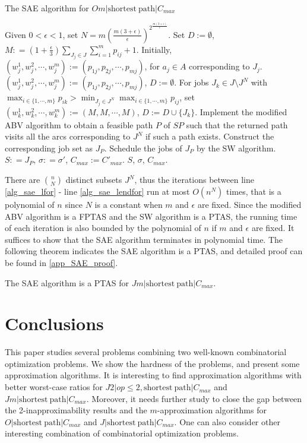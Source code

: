 \documentclass{llncs}
\numberwithin{subcase}{case}
\begin{document}
\begin{algorithm}[htb]
\caption{The SAE algorithm for $Om|\mathrm{shortest}~\mathrm{path}|C_{max}$}
\label{alg_sae}
\begin{algorithmic}[1]
\STATE Given $0< \epsilon <1$, set $N = m\left(\frac{m(3+\epsilon)}{\epsilon}\right)^{2^{\frac{m(3+\epsilon)}{\epsilon}}}$.
\STATE Set $D:=\emptyset$, $M : = (1+\frac{\epsilon}{3})\sum_{J_j\in J}\sum_{i = 1}^{m}p_{ij} + 1$.
\STATE Initially, $(w^1_j, w^2_j, \cdots, w^m_j) := (p_{1j}, p_{2j}, \cdots, p_{mj})$, for $a_j\in A$ corresponding to $J_j$.
\label{alg_sae_lfor}
\STATE $(w^1_j, w^2_j, \cdots, w^m_j) := (p_{1j}, p_{2j}, \cdots, p_{mj})$, $D:=\emptyset$.
\STATE For jobs $J_k \in J\setminus J^N$ with $\max_{i\in \{1, \cdots, m\}}p_{ik} > \min_{J_j\in J^N}\max_{i\in \{1, \cdots, m\}}p_{ij}$, set $(w^1_k, w^2_k, \cdots, w^m_k) := (M, M, \cdots, M)$, $D:= D\cup \{J_k\}$.
\STATE Implement the modified ABV algorithm to obtain a feasible path $P$ of $SP$ such that the returned path visits all the arcs corresponding to $J^N$ if such a path exists. Construct the corresponding job set as $J_P$.
\STATE Schedule the jobs of $J_P$ by the SW algorithm.
        \STATE $S : = J_P$, $\sigma: = \sigma'$, $C_{max}:=C'_{max}$.
    \ENDIF
\ENDFOR\label{alg_sae_lendfor}
\RETURN $S$, $\sigma$, $C_{max}$.
\end{algorithmic}
\end{algorithm}

There are ${n \choose N}$ distinct subsets $J^N$, thus the iterations between line \ref{alg_sae_lfor} - line \ref{alg_sae_lendfor} run at most $O(n^N)$ times, that is a polynomial of $n$ since $N$ is a constant when $m$ and $\epsilon$ are fixed. Since the modified ABV algorithm is a FPTAS and the SW algorithm is a PTAS, the running time of each iteration is also bounded by the polynomial of $n$ if $m$ and $\epsilon$ are fixed. It suffices to show that the SAE algorithm terminates in polynomial time. The following theorem indicates the SAE algorithm is a PTAS, and detailed proof can be found in \ref{app_SAE_proof}.

\begin{theorem}
The SAE algorithm is a PTAS for $Jm|\mathrm{shortest}~\mathrm{path}|C_{max}$.\label{th_SAE}
\end{theorem}

\section{Conclusions}\label{sec_end}
This paper studies several problems combining two well-known combinatorial optimization problems. We show the hardness of the problems, and present
some approximation algorithms. It is interesting to find approximation algorithms with better worst-case ratios for $J2|op\leq 2, \mathrm{shortest}~\mathrm{path}|C_{max}$ and $Jm|\mathrm{shortest}~\mathrm{path}|C_{max}$. Moreover, it needs further study to close the gap between the 2-inapproximability results and the $m$-approximation algorithms for $O|\mathrm{shortest}~\mathrm{path}|C_{max}$ and $J|\mathrm{shortest}~\mathrm{path}|C_{max}$. One can also consider other interesting combination of combinatorial optimization problems.
\end{document}
